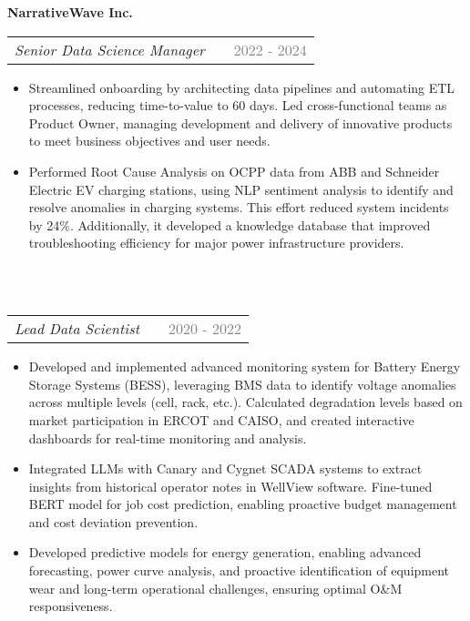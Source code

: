 \documentclass[a4paper,12pt]{article}
\makeatletter
\newenvironment{joblong}[3]
    {
    \noindent\textbf{\large #1}\\ %
    \begin{tabularx}{\linewidth}{@{}l X r@{}}
    \textit{#2} & &  {\textcolor{gray}{#3}} \\[3.75pt] %
    \end{tabularx}
    \begin{minipage}[t]{\linewidth}
    \begin{itemize}[nosep,after=\strut, leftmargin=1em, itemsep=3pt,label=--]
    }
    {
    \end{itemize}
    \end{minipage}    
    }
\makeatother
\begin{document}
\begin{joblong}{NarrativeWave Inc.}{Senior Data Science Manager}{2022 - 2024}
    \item Streamlined onboarding by architecting data pipelines and automating ETL processes, reducing time-to-value to 60 days. Led cross-functional teams as Product Owner, managing development and delivery of innovative products to meet business objectives and user needs.
    \item Performed Root Cause Analysis on OCPP data from ABB and Schneider Electric EV charging stations, using NLP sentiment analysis to identify and resolve anomalies in charging systems. This effort reduced system incidents by 24\%. Additionally, it developed a knowledge database that improved troubleshooting efficiency for major power infrastructure providers.
\end{joblong}
\\
\begin{joblong}{}{Lead Data Scientist}{2020 - 2022}
    \item Developed and implemented advanced monitoring system for Battery Energy Storage Systems (BESS), leveraging BMS data to identify voltage anomalies across multiple levels (cell, rack, etc.). Calculated degradation levels based on market participation in ERCOT and CAISO, and created interactive dashboards for real-time monitoring and analysis.
    \item Integrated LLMs with Canary and Cygnet SCADA systems to extract insights from historical operator notes in WellView software. Fine-tuned BERT model for job cost prediction, enabling proactive budget management and cost deviation prevention.
    \item Developed predictive models for energy generation, enabling advanced forecasting, power curve analysis, and proactive identification of equipment wear and long-term operational challenges, ensuring optimal O\&M responsiveness. 
\end{joblong}
\\
\end{document}
